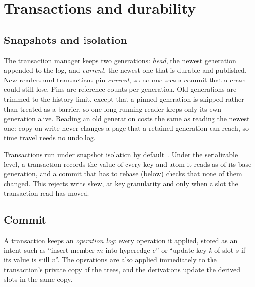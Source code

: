 \section{Transactions and durability}
\label{sec:transactions}

\subsection{Snapshots and isolation}

The transaction manager keeps two generations: \emph{head}, the newest generation appended to the log, and \emph{current}, the newest one that is durable and published. New readers and transactions pin \emph{current}, so no one sees a commit that a crash could still lose. Pins are reference counts per generation. Old generations are trimmed to the history limit, except that a pinned generation is skipped rather than treated as a barrier, so one long-running reader keeps only its own generation alive. Reading an old generation costs the same as reading the newest one: copy-on-write never changes a page that a retained generation can reach, so time travel needs no undo log.

Transactions run under snapshot isolation by default~\cite{critique}. Under the serializable level, a transaction records the value of every key and atom it reads as of its base generation, and a commit that has to rebase (below) checks that none of them changed. This rejects write skew, at key granularity and only when a slot the transaction read has moved.

\subsection{Commit}

A transaction keeps an \emph{operation log}: every operation it applied, stored as an intent such as ``insert member $m$ into hyperedge $e$'' or ``update key $k$ of slot $s$ if its value is still $v$''. The operations are also applied immediately to the transaction's private copy of the trees, and the derivations update the derived slots in the same copy.

